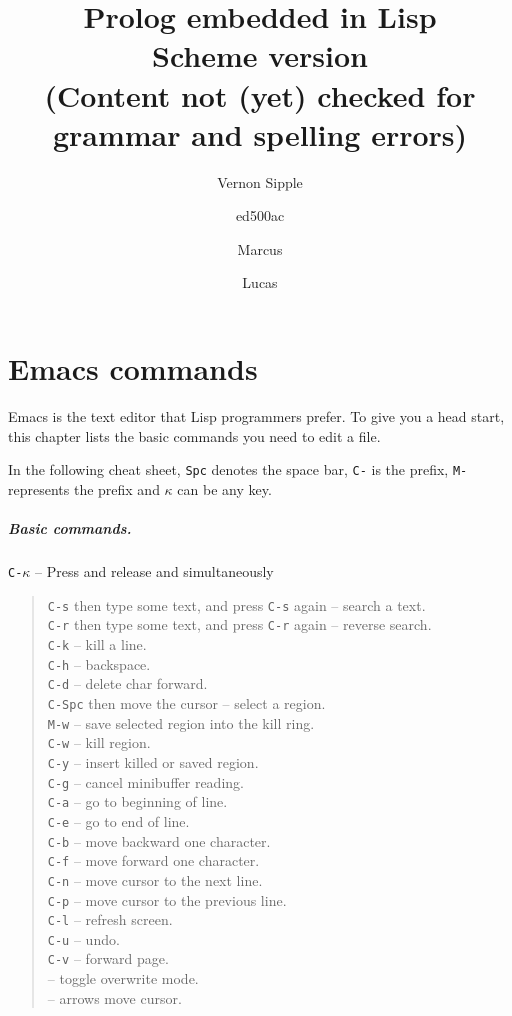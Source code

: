 \documentclass[a4paper,12pt]{book}
\title{Prolog embedded in Lisp\\
{\normalsize Scheme version}\\
{\normalsize (Content not (yet) checked for grammar and spelling errors)}}
\author{Vernon Sipple \and ed500ac \and Marcus \and Lucas}
\date{}
\begin{document}
\maketitle
\thispagestyle{empty}

\mainmatter

\chapter{Emacs commands}
Emacs is the text editor that Lisp programmers prefer.
To give you a head start, this chapter lists the basic
commands you need to edit a file.

In the following cheat sheet, \verb|Spc| denotes
the space bar, \verb|C-| is the  prefix, \verb|M-| represents 
the   prefix and  $\kappa$ can be any key. 

\paragraph{Basic commands.} \verb|C-|$\kappa$ -- Press and release 
and \keys{$\kappa$} simultaneously
\begin{quote}
	\verb|C-s| then type some text, and press \verb|C-s| again 
	-- search a text.\\
	\verb|C-r| then type some text, and press \verb|C-r| again 
	-- reverse search.\\
	\verb|C-k| -- kill a line.\\
	\verb|C-h| -- backspace.\\
	\verb|C-d| -- delete char forward.\\ 
	\verb|C-Spc| then move the cursor -- select a region.\\
	\verb|M-w| -- save selected region into the kill ring. \\
	\verb|C-w| -- kill region.\\
	\verb|C-y| -- insert killed or saved region.\\
	\verb|C-g| -- cancel minibuffer reading.\\
	\verb|C-a| -- go to beginning of line.\\
	\verb|C-e| -- go to end of line.\\
	\verb|C-b| -- move backward one character.\\
	\verb|C-f| -- move forward one character.\\
	\verb|C-n| -- move cursor to the next line.\\
	\verb|C-p| -- move cursor to the previous line.\\
	\verb|C-l| -- refresh screen.\\
	\verb|C-u| -- undo. \\
	\verb|C-v| -- forward page.\\
	 -- toggle overwrite mode.\\
	\keys{$\leftarrow$} \keys{$\rightarrow$} \keys{$\uparrow$} \keys{$\downarrow$} -- arrows move cursor.\\
\end{quote}
\end{document}
